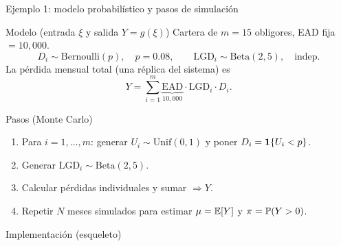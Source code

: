 \documentclass[aspectratio=1610, 9pt]{beamer}
\begin{document}
\begin{frame}[fragile]{Ejemplo 1: modelo probabilístico y pasos de simulación}
\small
\begin{block}{Modelo (entrada $\xi$ y salida $Y=g(\xi)$)}
Cartera de $m=15$ obligores, EAD fija $=10{,}000$.
\[
D_i\sim\mathrm{Bernoulli}(p),\quad p=0.08,
\qquad
\mathrm{LGD}_i\sim\mathrm{Beta}(2,5),
\quad \text{indep.}
\]
La pérdida mensual total (una réplica del sistema) es
\[
Y=\sum_{i=1}^{m} \underbrace{\mathrm{EAD}}_{10{,}000}\cdot \mathrm{LGD}_i\cdot D_i.
\]
\end{block}

\begin{block}{Pasos (Monte Carlo)}
\begin{enumerate}
\item Para $i=1,\dots,m$: generar $U_i\sim\mathrm{Unif}(0,1)$ y poner $D_i=\mathbf{1}\{U_i<p\}$.
\item Generar $\mathrm{LGD}_i\sim\mathrm{Beta}(2,5)$.
\item Calcular pérdidas individuales y sumar $\Rightarrow Y$.
\item Repetir $N$ meses simulados para estimar $\mu=\mathbb{E}[Y]$ y $\pi=\mathbb{P}(Y>0)$.
\end{enumerate}
\end{block}

\begin{block}{Implementación (esqueleto)}
\end{block}
\end{frame}
\end{document}
